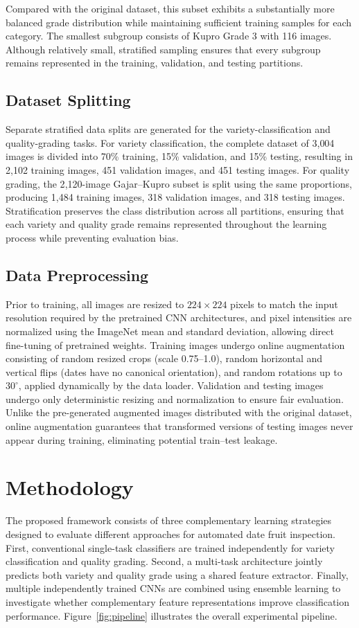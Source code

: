 \documentclass[conference]{IEEEtran}
\begin{document}
Compared with the original dataset, this subset exhibits a substantially more balanced grade distribution while maintaining sufficient training samples for each category. The smallest subgroup consists of Kupro Grade 3 with 116 images. Although relatively small, stratified sampling ensures that every subgroup remains represented in the training, validation, and testing partitions.

\subsection{Dataset Splitting}
Separate stratified data splits are generated for the variety-classification and quality-grading tasks. For variety classification, the complete dataset of 3{,}004 images is divided into 70\% training, 15\% validation, and 15\% testing, resulting in 2{,}102 training images, 451 validation images, and 451 testing images. For quality grading, the 2{,}120-image Gajar--Kupro subset is split using the same proportions, producing 1{,}484 training images, 318 validation images, and 318 testing images. Stratification preserves the class distribution across all partitions, ensuring that each variety and quality grade remains represented throughout the learning process while preventing evaluation bias.

\subsection{Data Preprocessing}
Prior to training, all images are resized to $224\times224$ pixels to match the input resolution required by the pretrained CNN architectures, and pixel intensities are normalized using the ImageNet mean and standard deviation, allowing direct fine-tuning of pretrained weights. Training images undergo online augmentation consisting of random resized crops (scale 0.75--1.0), random horizontal and vertical flips (dates have no canonical orientation), and random rotations up to $30^{\circ}$, applied dynamically by the data loader. Validation and testing images undergo only deterministic resizing and normalization to ensure fair evaluation. Unlike the pre-generated augmented images distributed with the original dataset, online augmentation guarantees that transformed versions of testing images never appear during training, eliminating potential train--test leakage.

\section{Methodology}
The proposed framework consists of three complementary learning strategies designed to evaluate different approaches for automated date fruit inspection. First, conventional single-task classifiers are trained independently for variety classification and quality grading. Second, a multi-task architecture jointly predicts both variety and quality grade using a shared feature extractor. Finally, multiple independently trained CNNs are combined using ensemble learning to investigate whether complementary feature representations improve classification performance. Figure~\ref{fig:pipeline} illustrates the overall experimental pipeline.
\end{document}
